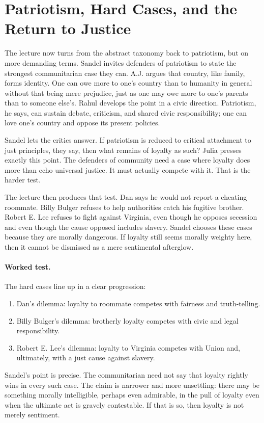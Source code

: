 \section{Patriotism, Hard Cases, and the Return to Justice}

The lecture now turns from the abstract taxonomy back to patriotism, but on more demanding terms. Sandel invites defenders of patriotism to state the strongest communitarian case they can. A.J. argues that country, like family, forms identity. One can owe more to one's country than to humanity in general without that being mere prejudice, just as one may owe more to one's parents than to someone else's. Rahul develops the point in a civic direction. Patriotism, he says, can sustain debate, criticism, and shared civic responsibility; one can love one's country and oppose its present policies.

Sandel lets the critics answer. If patriotism is reduced to critical attachment to just principles, they say, then what remains of loyalty as such? Julia presses exactly this point. The defenders of community need a case where loyalty does more than echo universal justice. It must actually compete with it. That is the harder test.

The lecture then produces that test. Dan says he would not report a cheating roommate. Billy Bulger refuses to help authorities catch his fugitive brother. Robert E. Lee refuses to fight against Virginia, even though he opposes secession and even though the cause opposed includes slavery. Sandel chooses these cases because they are morally dangerous. If loyalty still seems morally weighty here, then it cannot be dismissed as a mere sentimental afterglow.

\paragraph{Worked test.} The hard cases line up in a clear progression:
\begin{enumerate}
\item Dan's dilemma: loyalty to roommate competes with fairness and truth-telling.
\item Billy Bulger's dilemma: brotherly loyalty competes with civic and legal responsibility.
\item Robert E. Lee's dilemma: loyalty to Virginia competes with Union and, ultimately, with a just cause against slavery.
\end{enumerate}

Sandel's point is precise. The communitarian need not say that loyalty rightly wins in every such case. The claim is narrower and more unsettling: there may be something morally intelligible, perhaps even admirable, in the pull of loyalty even when the ultimate act is gravely contestable. If that is so, then loyalty is not merely sentiment.


